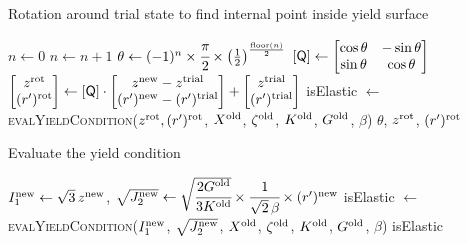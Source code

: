 \begin{breakablealgorithm}
\caption{Rotation around trial state to find internal point inside yield surface}
\begin{algorithmic}[1]
    \State $n \leftarrow 0$
    \Repeat
      \State $n \leftarrow n+1$
      \State $\theta \leftarrow (-1)^n \times \cfrac{\pi}{2} \times \left(\tfrac{1}{2}\right)^{\frac{\text{floor}(n)}{2}}$
      \State $\left[\mathsf{Q}\right] \leftarrow 
              \begin{bmatrix} \cos\theta & -\sin\theta \\ \sin\theta & \cos\theta \end{bmatrix}$
      \State $\begin{bmatrix} z^{\text{rot}} \\ (r')^{\text{rot}} \end{bmatrix} \leftarrow
              \left[\mathsf{Q}\right] \cdot \begin{bmatrix} z^{\text{new}} - z^{\text{trial}} \\ (r')^{\text{new}} - (r')^{\text{trial}} \end{bmatrix} +
              \begin{bmatrix} z^{\text{trial}} \\ (r')^{\text{trial}} \end{bmatrix}$
      \State isElastic $\leftarrow$ \textsc{evalYieldCondition}($z^{\text{rot}}, (r')^{\text{rot}}$,
                                                                $X^{\text{old}}$, $\zeta^{\text{old}}$, 
                                                                $K^{\text{old}}$, $G^{\text{old}}$, $\beta$)
    \State \Return $\theta$, $z^{\text{rot}}$, $(r')^{\text{rot}}$
  \EndProcedure
\end{algorithmic}
\end{breakablealgorithm}

\begin{breakablealgorithm}
\caption{Evaluate the yield condition}
\begin{algorithmic}[1]
     \State $I_1^{\text{new}} \leftarrow \sqrt{3}\,z^{\text{new}}$, 
            $\sqrt{J_2^{\text{new}}} \leftarrow \sqrt{\cfrac{2G^{\text{old}}}{3K^{\text{old}}}}\times
              \cfrac{1}{\sqrt{2}\,\beta}\times(r')^{\text{new}}$
     \State isElastic $\leftarrow$ \textsc{evalYieldCondition}($I_1^{\text{new}}$, $\sqrt{J_2^{\text{new}}}$, 
                                                             $X^{\text{old}}$, $\zeta^{\text{old}}$, 
                                                             $K^{\text{old}}$, $G^{\text{old}}$, $\beta$)
     \State \Return isElastic
  \EndProcedure
\end{algorithmic}
\end{breakablealgorithm}
